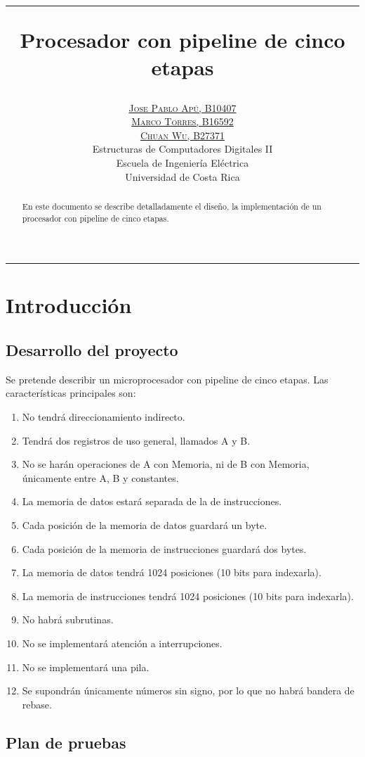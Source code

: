 \documentclass[paper=letter, fontsize=12pt]{article}
\title{\vspace{-20mm}\hrule\vspace{5mm}\fontsize{24pt}{10pt}\selectfont\textbf{Procesador con pipeline de cinco etapas}} %
\author{
\large
\href{mailto:josepabloapu@gmail.com}{\textsc{Jose Pablo Apú, B10407}}\\\href{mailto:marco.torres.810@gmail.com}{\textsc{Marco Torres, B16592}}\\\href{mailto:}{\textsc{Chuan Wu, B27371}} \\[2mm]
\normalsize Estructuras de Computadores Digitales II \\[1mm] %
\normalsize Escuela de Ingeniería Eléctrica \\ %
\normalsize Universidad de Costa Rica \\ %
}
\date{}
\begin{document}
\maketitle 
\hrule
\begin{abstract}
En este documento se describe detalladamente el diseño, la implementación de un procesador con pipeline de cinco etapas.   
\end{abstract}

\section{Introducción}

\subsection{Desarrollo del proyecto}

Se pretende describir un microprocesador con pipeline de cinco etapas. Las características principales son:

\begin{enumerate}
\item No tendrá direccionamiento indirecto.
\item Tendrá dos registros de uso general, llamados A y B.
\item No se harán operaciones de A con Memoria, ni de B con Memoria, únicamente entre A, B y constantes.
\item La memoria de datos estará separada de la de instrucciones.
\item Cada posición de la memoria de datos guardará un byte.
\item Cada posición de la memoria de instrucciones guardará dos bytes.
\item La memoria de datos tendrá 1024 posiciones (10 bits para indexarla).
\item La memoria de instrucciones tendrá 1024 posiciones (10 bits para indexarla).
\item No habrá subrutinas.
\item No se implementará atención a interrupciones.
\item No se implementará una pila.
\item Se supondrán únicamente números sin signo, por lo que no habrá bandera de rebase.
\end{enumerate}

\subsection{Plan de pruebas}
\end{document}

